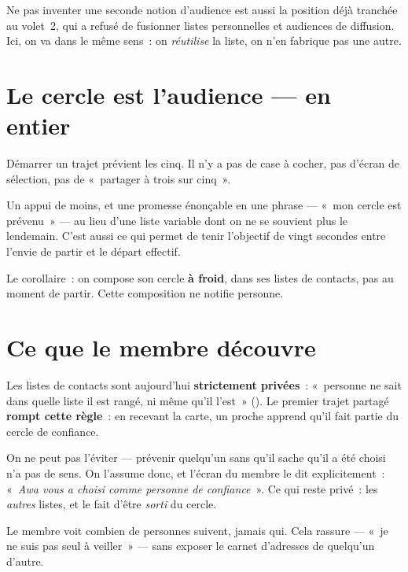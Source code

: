 Ne pas inventer une seconde notion d'audience est aussi la position déjà tranchée au
volet~2, qui a refusé de fusionner listes personnelles et audiences de diffusion. Ici, on va
dans le même sens~: on \emph{réutilise} la liste, on n'en fabrique pas une autre.

\section{Le cercle est l'audience --- en entier}

Démarrer un trajet prévient les cinq. Il n'y a pas de case à cocher, pas d'écran de
sélection, pas de «~partager à trois sur cinq~».

\begin{note}
Un appui de moins, et une promesse énonçable en une phrase --- «~mon cercle est prévenu~» —
au lieu d'une liste variable dont on ne se souvient plus le lendemain. C'est aussi ce qui
permet de tenir l'objectif de vingt secondes entre l'envie de partir et le départ effectif.

Le corollaire~: on compose son cercle \textbf{à froid}, dans ses listes de contacts, pas au
moment de partir. Cette composition ne notifie personne.
\end{note}

\section{Ce que le membre découvre}

\begin{alerte}
Les listes de contacts sont aujourd'hui \textbf{strictement privées}~: «~personne ne sait
dans quelle liste il est rangé, ni même qu'il l'est~»
(). Le premier trajet partagé \textbf{rompt cette règle}~:
en recevant la carte, un proche apprend qu'il fait partie du cercle de confiance.

On ne peut pas l'éviter --- prévenir quelqu'un sans qu'il sache qu'il a été choisi n'a pas
de sens. On l'assume donc, et l'écran du membre le dit explicitement~:
«~\emph{Awa vous a choisi comme personne de confiance}~». Ce qui reste privé~: les
\emph{autres} listes, et le fait d'être \emph{sorti} du cercle.
\end{alerte}

Le membre voit combien de personnes suivent, jamais qui. Cela rassure --- «~je ne suis pas
seul à veiller~» --- sans exposer le carnet d'adresses de quelqu'un d'autre.

